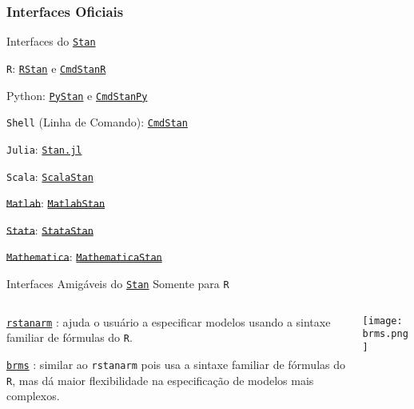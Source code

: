 \subsubsection{Interfaces Oficiais}
\begin{frame}{Interfaces do \href{https://mc-stan.org}{\texttt{Stan}}}
	\begin{vfilleditems}
		\item \texttt{R}: \href{https://mc-stan.org/users/interfaces/rstan.html}{\texttt{RStan}} e \href{https://mc-stan.org/cmdstanr}{\texttt{CmdStanR}}
		\item Python: \href{https://mc-stan.org/users/interfaces/pystan.html}{\texttt{PyStan}} e \href{https://cmdstanpy.readthedocs.io/en/latest/getting_started.html}{\texttt{CmdStanPy}}
		\item \texttt{Shell} (Linha de Comando): \href{https://mc-stan.org/users/interfaces/cmdstan.html}{\texttt{CmdStan}}
		\item \texttt{Julia}: \href{https://mc-stan.org/users/interfaces/julia-stan.html}{\texttt{Stan.jl}}
		\item \texttt{Scala}: \href{https://github.com/cibotech/ScalaStan}{\texttt{ScalaStan}}
		\item \sout{\texttt{Matlab}}: \href{https://mc-stan.org/users/interfaces/matlab-stan.html}{\sout{\texttt{MatlabStan}}}
		\item \sout{\texttt{Stata}}: \href{https://mc-stan.org/users/interfaces/stata-stan.html}{\sout{\texttt{StataStan}}}
		\item \sout{\texttt{Mathematica}}: \href{https://mc-stan.org/users/interfaces/mathematica-stan.html}{\sout{\texttt{MathematicaStan}}}
	\end{vfilleditems}
\end{frame}

\begin{frame}{Interfaces Amigáveis do \href{https://mc-stan.org}{\texttt{Stan}}}
	Somente para \texttt{R}
	\begin{columns}
		\begin{column}{0.8\textwidth}
			\begin{vfilleditems}
				\item \href{http://mc-stan.org/rstanarm/}{\texttt{rstanarm}} \parencite{rstanarm}: ajuda o usuário a especificar modelos usando a sintaxe familiar de fórmulas do \texttt{R}.
				\item \href{https://paul-buerkner.github.io/brms/}{\texttt{brms}} \parencite{brms}: similar ao \texttt{rstanarm} pois usa a sintaxe familiar de fórmulas do \texttt{R}, mas dá maior flexibilidade na especificação de modelos mais complexos.
			\end{vfilleditems}
		\end{column}
		\begin{column}{0.2\textwidth}
			\centering
			\texttt{[image: brms.png]}
		\end{column}
	\end{columns}
\end{frame}

